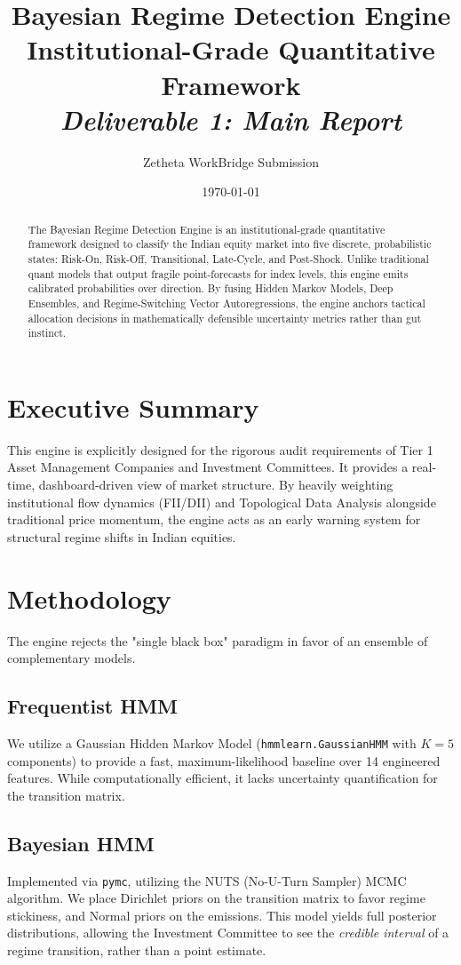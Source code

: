 \documentclass[11pt,a4paper]{article}
\title{\textbf{\Huge Bayesian Regime Detection Engine} \\ \vspace{0.5em} \Large Institutional-Grade Quantitative Framework \\ \vspace{1em} \normalsize \textit{Deliverable 1: Main Report}}
\author{Zetheta WorkBridge Submission}
\date{\today}
\begin{document}
\maketitle
\thispagestyle{empty}

\begin{abstract}
The Bayesian Regime Detection Engine is an institutional-grade quantitative framework designed to classify the Indian equity market into five discrete, probabilistic states: Risk-On, Risk-Off, Transitional, Late-Cycle, and Post-Shock. Unlike traditional quant models that output fragile point-forecasts for index levels, this engine emits calibrated probabilities over direction. By fusing Hidden Markov Models, Deep Ensembles, and Regime-Switching Vector Autoregressions, the engine anchors tactical allocation decisions in mathematically defensible uncertainty metrics rather than gut instinct.
\end{abstract}

\tableofcontents
\newpage

\section{Executive Summary}
This engine is explicitly designed for the rigorous audit requirements of Tier 1 Asset Management Companies and Investment Committees. It provides a real-time, dashboard-driven view of market structure. By heavily weighting institutional flow dynamics (FII/DII) and Topological Data Analysis alongside traditional price momentum, the engine acts as an early warning system for structural regime shifts in Indian equities.

\section{Methodology}
The engine rejects the "single black box" paradigm in favor of an ensemble of complementary models.

\subsection{Frequentist HMM}
We utilize a Gaussian Hidden Markov Model (\texttt{hmmlearn.GaussianHMM} with $K=5$ components) to provide a fast, maximum-likelihood baseline over 14 engineered features. While computationally efficient, it lacks uncertainty quantification for the transition matrix.

\subsection{Bayesian HMM}
Implemented via \texttt{pymc}, utilizing the NUTS (No-U-Turn Sampler) MCMC algorithm. We place Dirichlet priors on the transition matrix to favor regime stickiness, and Normal priors on the emissions. This model yields full posterior distributions, allowing the Investment Committee to see the \textit{credible interval} of a regime transition, rather than a point estimate.
\end{document}
